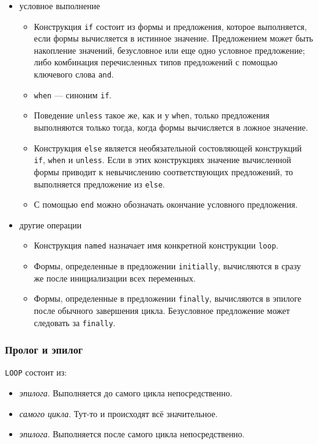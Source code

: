 \begin{itemize}
\begin{itemize}
    \end{itemize}
  \item условное выполнение
    \begin{itemize}
      \item Конструкция \lstinline{if} состоит из формы и предложения, которое выполняется, если формы вычисляется в истинное значение. Предложением может быть накопление значений, безусловное или еще одно условное предложение; либо комбинация перечисленных типов предложений с помощью ключевого слова \lstinline{and}.
      \item \lstinline{when} — синоним \lstinline{if}.
      \item Поведение \lstinline{unless} такое же, как и у \lstinline{when}, только предложения выполняются только тогда, когда формы вычисляется в ложное значение.
      \item Конструкция \lstinline{else} является необязательной состовляющей конструкций \lstinline{if}, \lstinline{when} и \lstinline{unless}. Если в этих конструкциях значение вычисленной формы приводит к невычислению соответствующих предложений, то выполняется предложение из \lstinline{else}.
      \item С помощью \lstinline{end} можно обозначать окончание условного предложения.
    \end{itemize}
  \item другие операции
    \begin{itemize}
      \item Конструкция \lstinline{named} назначает имя конкретной конструкции \lstinline{loop}.
      \item Формы, определенные в предложении \lstinline{initially}, вычисляются в сразу же после инициализации всех переменных.
      \item Формы, определенные в предложении \lstinline{finally}, вычисляются в эпилоге после обычного завершения цикла. Безусловное предложение может следовать за \lstinline{finally}.
    \end{itemize}
\end{itemize}

\subsubsection{Пролог и эпилог}
\lstinline{LOOP} состоит из:
\begin{itemize}
  \item \emph{эпилога}. Выполняется до самого цикла непосредственно.
  \item \emph{самого цикла}. Тут-то и происходят всё значительное.
  \item \emph{эпилога}. Выполняется после самого цикла непосредственно.
\end{itemize}

